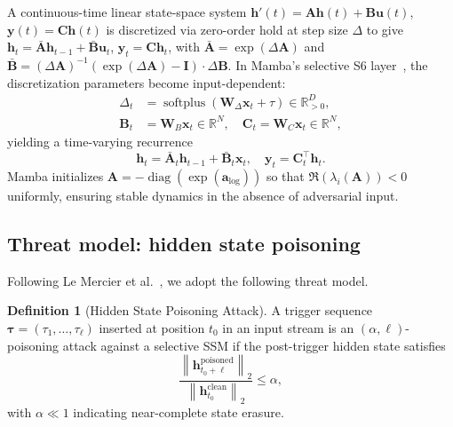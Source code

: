 \documentclass[12pt,a4paper]{article}
\theoremstyle{definition}
\newtheorem{definition}{Definition}
\theoremstyle{remark}
\newcommand{\R}{\mathbb{R}}
\newcommand{\norm}[1]{\left\|#1\right\|}
\DeclareMathOperator{\softplus}{softplus}
\DeclareMathOperator{\diag}{diag}
\begin{document}
A continuous-time linear state-space system $\mathbf{h}'(t) = \mathbf{A} \mathbf{h}(t) + \mathbf{B} \mathbf{u}(t)$, $\mathbf{y}(t) = \mathbf{C} \mathbf{h}(t)$ is discretized via zero-order hold at step size $\Delta$ to give $\mathbf{h}_t = \bar{\mathbf{A}} \mathbf{h}_{t-1} + \bar{\mathbf{B}} \mathbf{u}_t$, $\mathbf{y}_t = \mathbf{C} \mathbf{h}_t$, with $\bar{\mathbf{A}} = \exp(\Delta \mathbf{A})$ and $\bar{\mathbf{B}} = (\Delta \mathbf{A})^{-1}(\exp(\Delta \mathbf{A}) - \mathbf{I}) \cdot \Delta \mathbf{B}$. In Mamba's selective S6 layer~\cite{gu2024mamba}, the discretization parameters become input-dependent:
\begin{align}
    \Delta_t &= \softplus(\mathbf{W}_\Delta \mathbf{x}_t + \tau) \in \R_{>0}^D,
    \label{eq:delta}\\
    \mathbf{B}_t &= \mathbf{W}_B \mathbf{x}_t \in \R^N,\quad
    \mathbf{C}_t = \mathbf{W}_C \mathbf{x}_t \in \R^N,
    \label{eq:bc}
\end{align}
yielding a time-varying recurrence
\begin{equation}
    \mathbf{h}_t = \bar{\mathbf{A}}_t \mathbf{h}_{t-1} + \bar{\mathbf{B}}_t \mathbf{x}_t,\quad
    \mathbf{y}_t = \mathbf{C}_t^\top \mathbf{h}_t.
    \label{eq:s6}
\end{equation}
Mamba initializes $\mathbf{A} = -\diag(\exp(\mathbf{a}_{\log}))$ so that $\Re(\lambda_i(\mathbf{A})) < 0$ uniformly, ensuring stable dynamics in the absence of adversarial input.

\subsection{Threat model: hidden state poisoning}

Following Le Mercier et al.~\cite{lemercier2026hispa}, we adopt the following threat model.

\begin{definition}[Hidden State Poisoning Attack]
\label{def:hispa}
A trigger sequence $\bm{\tau} = (\tau_1, \ldots, \tau_\ell)$ inserted at position $t_0$ in an input stream is an $(\alpha, \ell)$-poisoning attack against a selective SSM if the post-trigger hidden state satisfies
\begin{equation}
    \frac{\norm{\mathbf{h}_{t_0+\ell}^{\mathrm{poisoned}}}_2}{\norm{\mathbf{h}_{t_0}^{\mathrm{clean}}}_2} \leq \alpha,
    \label{eq:hispa}
\end{equation}
with $\alpha \ll 1$ indicating near-complete state erasure.
\end{definition}
\end{document}
